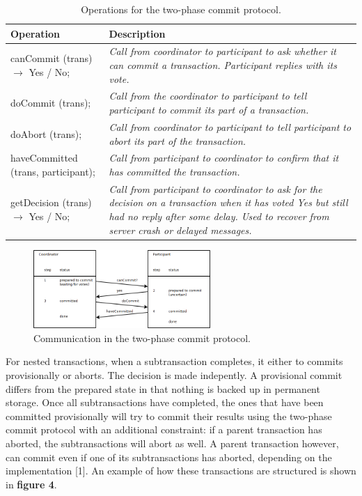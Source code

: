 \begin{table}
	\caption{Operations for the two-phase commit protocol.}
	\label{tab:api:twophasecommit}
	\begin{tabular}{p{150px} | p{250px}}
		\textbf{Operation} & \textbf{Description} \\
		\hline
		canCommit (trans) $\rightarrow$ Yes / No; 		& \emph{Call from coordinator to participant to ask whether it can commit a transaction. Participant replies with its vote.} \\
		doCommit (trans); 														& \emph{Call from the coordinator to participant to tell participant to commit its part of a transaction.} \\
		doAbort (trans);															& \emph{Call from coordinator to participant to tell participant to abort its part of the transaction.} \\
		haveCommitted (trans, participant); 					& \emph{Call from participant to coordinator to confirm that it has committed the transaction.} \\
		getDecision (trans) $\rightarrow$ Yes / No; 	& \emph{Call from participant to coordinator to ask for the decision on a transaction when it has voted Yes but still had no reply after some delay. Used to recover from server crash or delayed messages.} \\
		\hline
	\end{tabular}
\end{table}


\begin{figure}
	\begin{center}
		\includegraphics[width=0.6\textwidth]{img/twophasecommit}
	\end{center}
	\caption{Communication in the two-phase commit protocol.}
	\label{fig:twophasecommit}
\end{figure}




For nested transactions, when a subtransaction completes, it either to commits provisionally or aborts. The decision is made indepently. A provisional commit differs from the prepared state in that nothing is backed up in permanent storage. Once all subtransactions have completed, the ones that have been committed provisionally will try to commit their results using the two-phase commit protocol with an additional constraint: if a parent transaction has aborted, the subtransactions will abort as well. A parent transaction however, can commit even if one of its subtransactions has aborted, depending on the implementation [1]. An example of how these transactions are structured is shown in \textbf{figure 4}.

